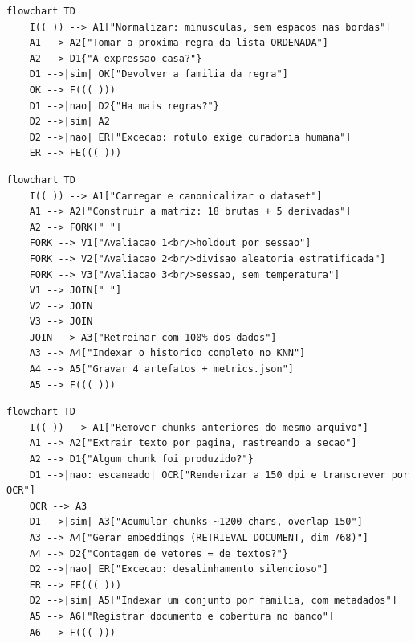 \begin{lstlisting}[language=mermaid, caption={AT-02 --- canonicalização de um rótulo bruto}, label={lst:mmat02}]
flowchart TD
    I(( )) --> A1["Normalizar: minusculas, sem espacos nas bordas"]
    A1 --> A2["Tomar a proxima regra da lista ORDENADA"]
    A2 --> D1{"A expressao casa?"}
    D1 -->|sim| OK["Devolver a familia da regra"]
    OK --> F((( )))
    D1 -->|nao| D2{"Ha mais regras?"}
    D2 -->|sim| A2
    D2 -->|nao| ER["Excecao: rotulo exige curadoria humana"]
    ER --> FE((( )))
\end{lstlisting}

\begin{lstlisting}[language=mermaid, caption={AT-03 --- treino do motor de diagnóstico}, label={lst:mmat03}]
flowchart TD
    I(( )) --> A1["Carregar e canonicalizar o dataset"]
    A1 --> A2["Construir a matriz: 18 brutas + 5 derivadas"]
    A2 --> FORK[" "]
    FORK --> V1["Avaliacao 1<br/>holdout por sessao"]
    FORK --> V2["Avaliacao 2<br/>divisao aleatoria estratificada"]
    FORK --> V3["Avaliacao 3<br/>sessao, sem temperatura"]
    V1 --> JOIN[" "]
    V2 --> JOIN
    V3 --> JOIN
    JOIN --> A3["Retreinar com 100% dos dados"]
    A3 --> A4["Indexar o historico completo no KNN"]
    A4 --> A5["Gravar 4 artefatos + metrics.json"]
    A5 --> F((( )))
\end{lstlisting}

\begin{lstlisting}[language=mermaid, caption={AT-04 --- indexação de um documento orientativo}, label={lst:mmat04}]
flowchart TD
    I(( )) --> A1["Remover chunks anteriores do mesmo arquivo"]
    A1 --> A2["Extrair texto por pagina, rastreando a secao"]
    A2 --> D1{"Algum chunk foi produzido?"}
    D1 -->|nao: escaneado| OCR["Renderizar a 150 dpi e transcrever por OCR"]
    OCR --> A3
    D1 -->|sim| A3["Acumular chunks ~1200 chars, overlap 150"]
    A3 --> A4["Gerar embeddings (RETRIEVAL_DOCUMENT, dim 768)"]
    A4 --> D2{"Contagem de vetores = de textos?"}
    D2 -->|nao| ER["Excecao: desalinhamento silencioso"]
    ER --> FE((( )))
    D2 -->|sim| A5["Indexar um conjunto por familia, com metadados"]
    A5 --> A6["Registrar documento e cobertura no banco"]
    A6 --> F((( )))
\end{lstlisting}

